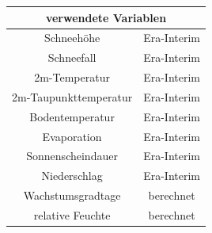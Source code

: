 \documentclass[]{article}
\begin{document}
\begin{tabular}{|c|c|}
	\multicolumn{2}{c}{verwendete Variablen}\\
	\hline
	Schneehöhe& Era-Interim\\
	\hline
	Schneefall& Era-Interim\\
	\hline
	2m-Temperatur& Era-Interim \\
	\hline
	2m-Taupunkttemperatur& Era-Interim\\
	\hline
	Bodentemperatur&Era-Interim\\
	\hline
	Evaporation& Era-Interim\\
	\hline
	Sonnenscheindauer& Era-Interim\\
	\hline
	Niederschlag& Era-Interim\\
	\hline
	Wachstumsgradtage& berechnet\\
	\hline
	relative Feuchte& berechnet\\
	\hline
\end{tabular}
\end{document}
